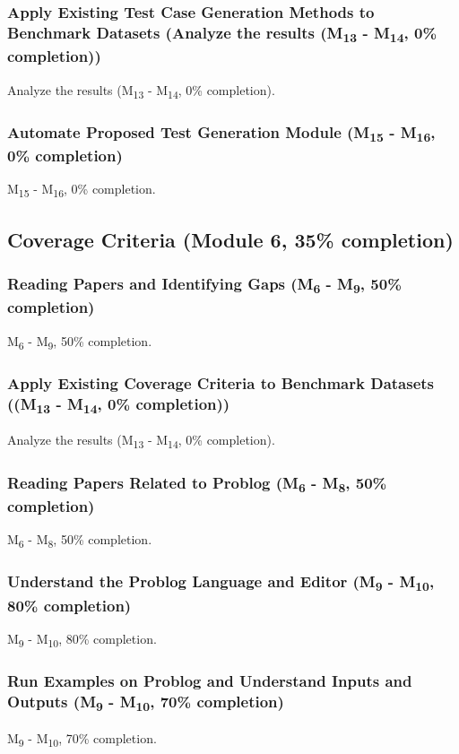 \subsubsection{Apply Existing Test Case Generation Methods to Benchmark Datasets (Analyze the results (M\textsubscript{13} - M\textsubscript{14}, 0\% completion))}
Analyze the results (M\textsubscript{13} - M\textsubscript{14}, 0\% completion).

\subsubsection{Automate Proposed Test Generation Module (M\textsubscript{15} - M\textsubscript{16}, 0\% completion)}
M\textsubscript{15} - M\textsubscript{16}, 0\% completion.

\subsection{Coverage Criteria (Module 6, 35\% completion)}
\subsubsection{Reading Papers and Identifying Gaps (M\textsubscript{6} - M\textsubscript{9}, 50\% completion)}
M\textsubscript{6} - M\textsubscript{9}, 50\% completion.

\subsubsection{Apply Existing Coverage Criteria to Benchmark Datasets ((M\textsubscript{13} - M\textsubscript{14}, 0\% completion))}
Analyze the results (M\textsubscript{13} - M\textsubscript{14}, 0\% completion).

\subsubsection{Reading Papers Related to Problog (M\textsubscript{6} - M\textsubscript{8}, 50\% completion)}
M\textsubscript{6} - M\textsubscript{8}, 50\% completion.

\subsubsection{Understand the Problog Language and Editor (M\textsubscript{9} - M\textsubscript{10}, 80\% completion)}
M\textsubscript{9} - M\textsubscript{10}, 80\% completion.

\subsubsection{Run Examples on Problog and Understand Inputs and Outputs (M\textsubscript{9} - M\textsubscript{10}, 70\% completion)}
M\textsubscript{9} - M\textsubscript{10}, 70\% completion.

